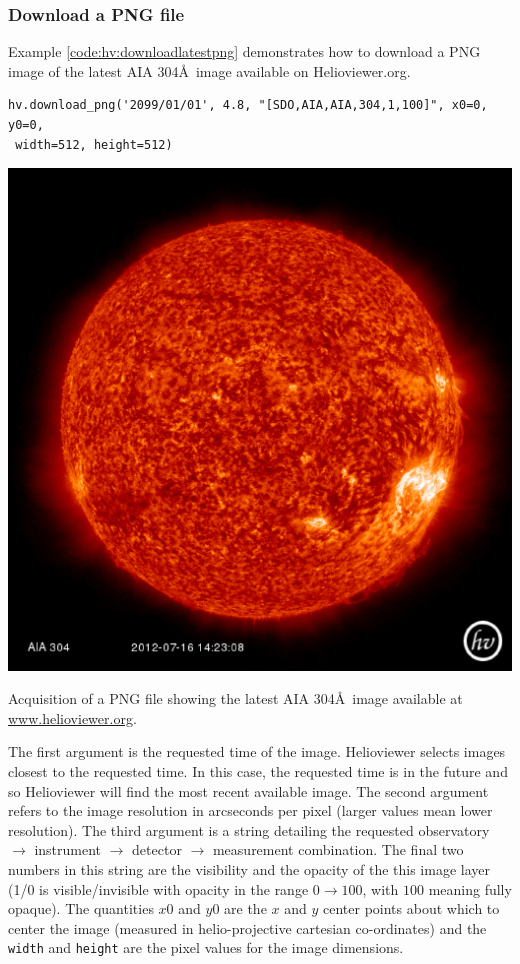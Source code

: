 \subsubsection{Download a PNG file}\label{sssec:hv:png}

Example \ref{code:hv:downloadlatestpng} demonstrates how to download a
PNG image of the latest AIA 304\AA\ image available on
Helioviewer.org.

\begin{listing}
\begin{verbatim}
hv.download_png('2099/01/01', 4.8, "[SDO,AIA,AIA,304,1,100]", x0=0, y0=0,
 width=512, height=512)
\end{verbatim}
\includegraphics[width=0.8\columnwidth]{helioviewer_latest_aia_304.eps}
\caption{Acquisition of a PNG file showing the latest AIA 304\AA\ image 
available at \url{www.helioviewer.org}.}
\label{code:hv:downloadlatestpng}
\end{listing}

The first argument is the requested time of the image.  Helioviewer
selects images closest to the requested time.  In this case, the
requested time is in the future and so Helioviewer will find the most
recent available image.  The second argument refers to the image
resolution in arcseconds per pixel (larger values mean lower
resolution).  The third argument is a string detailing the requested
observatory $\rightarrow$ instrument $\rightarrow$ detector
$\rightarrow$ measurement combination.  The final two numbers in this
string are the visibility and the opacity of the this image layer (1/0
is visible/invisible with opacity in the range $0\rightarrow100$, with
$100$ meaning fully opaque).  The quantities $x0$ and $y0$ are the $x$
and $y$ center points about which to center the image (measured in
helio-projective cartesian co-ordinates) and the \texttt{width} and
\texttt{height} are the pixel values for the image dimensions.

